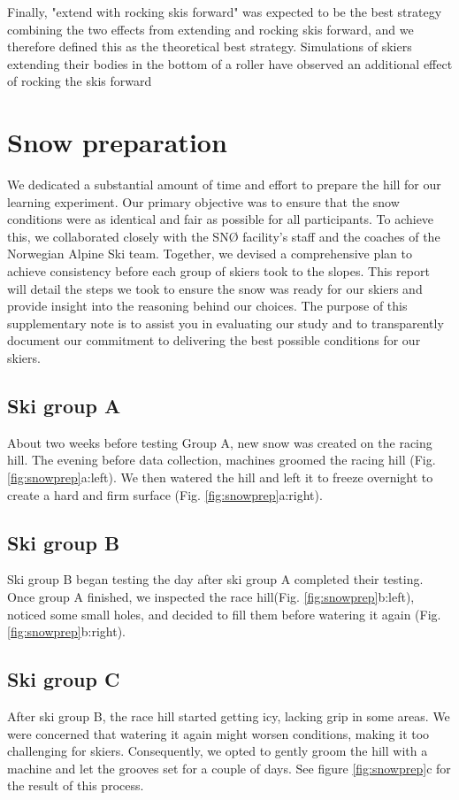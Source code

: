 \documentclass[pdflatex,sn-mathphys-num]{sn-jnl}%
\theoremstyle{thmstyleone}%
\theoremstyle{thmstyletwo}%
\theoremstyle{thmstylethree}%
\begin{document}
\begin{appendices}
Finally, "extend with rocking skis forward" was expected to be the best strategy combining the two effects from extending and rocking skis forward, and we therefore defined this as the theoretical best strategy. Simulations of skiers extending their bodies in the bottom of a roller have observed an additional effect of rocking the skis forward \cite{mote_accelerations_1983}


\section{Snow preparation}\label{sup_snowprep}
We dedicated a substantial amount of time and effort to prepare the hill for our learning experiment. Our primary objective was to ensure that the snow conditions were as identical and fair as possible for all participants. To achieve this, we collaborated closely with the SNØ facility’s staff and the coaches of the Norwegian Alpine Ski team. Together, we devised a comprehensive plan to achieve consistency before each group of skiers took to the slopes. This report will detail the steps we took to ensure the snow was ready for our skiers and provide insight into the reasoning behind our choices. The purpose of this supplementary note is to assist you in evaluating our study and to transparently document our commitment to delivering the best possible conditions for our skiers.

\subsection*{Ski group A}
About two weeks before testing Group A, new snow was created on the racing hill. The evening before data collection, machines groomed the racing hill (Fig. \ref{fig:snowprep}a:left). We then watered the hill and left it to freeze overnight to create a hard and firm surface (Fig. \ref{fig:snowprep}a:right). 

\subsection*{Ski group B}
Ski group B began testing the day after ski group A completed their testing. Once group A finished, we inspected the race hill(Fig. \ref{fig:snowprep}b:left), noticed some small holes, and decided to fill them before watering it again (Fig. \ref{fig:snowprep}b:right).  

\subsection*{Ski group C}
After ski group B, the race hill started getting icy, lacking grip in some areas. We were concerned that watering it again might worsen conditions, making it too challenging for skiers. Consequently, we opted to gently groom the hill with a machine and let the grooves set for a couple of days. See figure \ref{fig:snowprep}c for the result of this process.


\end{appendices}
\end{document}
